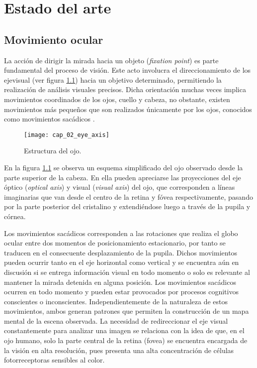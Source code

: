 \documentclass[../Main.tex]{subfiles}
\begin{document}
		
\chapter{Estado del arte}
\label{cha:02_estado_del_arte}
	\section{Movimiento ocular}
	\label{sec:02_movimiento_ocular}
		La acción de dirigir la mirada hacia un objeto (\textit{fixation point}) es parte fundamental del proceso de visión. Este acto involucra el direccionamiento de los \gls{ejevisual} (ver figura \ref{fig:02_eye_axis}) hacia un objetivo determinado, permitiendo la realización de análisis visuales precisos. Dicha orientación muchas veces implica movimientos coordinados de los ojos, cuello y cabeza, no obstante, existen movimientos más pequeños que son realizados únicamente por los ojos, conocidos como movimientos sacádicos \cite{article:movOcular1, article:movOcular2}.
		\begin{figure}[H]
			\centering
			\texttt{[image: cap\_02\_eye\_axis]}
			\caption[Estructura del ojo]{Estructura del ojo\footnotemark.}
			\label{fig:02_eye_axis}
		\end{figure}

		En la figura \ref{fig:02_eye_axis} se observa un esquema simplificado del ojo observado desde la parte superior de la cabeza. En ella pueden apreciarse las proyecciones del eje óptico (\textit{optical axis}) y visual (\textit{visual axis}) del ojo, que corresponden a líneas imaginarias que van desde el centro de la retina y fóvea respectivamente, pasando por la parte posterior del cristalino y extendiéndose luego a través de la pupila y córnea.  

		Los movimientos sacádicos corresponden a las rotaciones que realiza el globo ocular entre dos momentos de posicionamiento estacionario, por tanto se traducen en el consecuente desplazamiento de la pupila. Dichos movimientos pueden ocurrir tanto en el eje horizontal como vertical y se encuentra aún en discusión \cite{article:movOcular2, article:movOcular3} si se entrega información visual en todo momento o solo es relevante al mantener la mirada detenida en alguna posición. Los movimientos sacádicos ocurren en todo momento y pueden estar provocados por procesos cognitivos conscientes o inconscientes. Independientemente de la naturaleza de estos movimientos, ambos generan patrones que permiten la construcción de un mapa mental de la escena observada. La necesidad de redireccionar el eje visual constantemente para analizar una imagen se relaciona con la idea de que, en el ojo humano, solo la parte central de la retina (\gls{fovea}) se encuentra encargada de la visión en alta resolución, pues presenta una alta concentración de células fotorreceptoras sensibles al color. 
\end{document}
